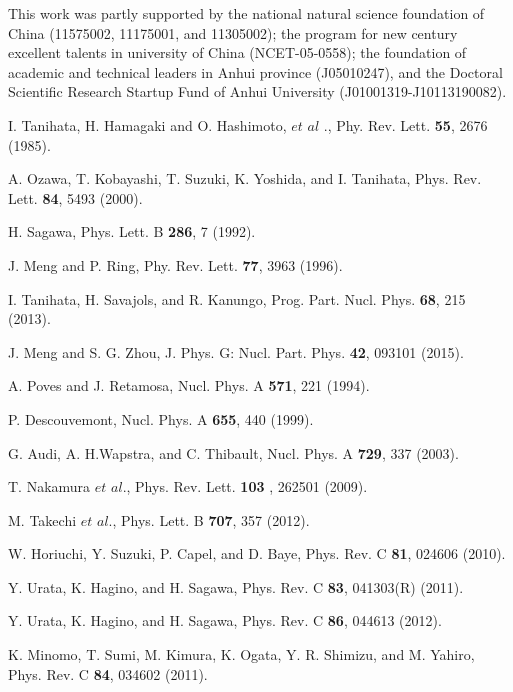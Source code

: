 \documentclass[twocolumn,prc,showpacs,preprintnumbers,superscriptaddress,floatfix]{revtex4}
\begin{document}
\begin{acknowledgments}
This work was partly supported by the national natural science foundation of
China (11575002, 11175001, and 11305002); the program for new century
excellent talents in university of China (NCET-05-0558); the foundation of
academic and technical leaders in Anhui province (J05010247), and the Doctoral Scientific Research Startup Fund of Anhui University (J01001319-J10113190082).
\end{acknowledgments}

\begin{thebibliography}{99}
 I. Tanihata, H. Hamagaki and O. Hashimoto, $et$ $al$%
., Phy. Rev. Lett. \textbf{55}, 2676 (1985).

 A. Ozawa, T. Kobayashi, T. Suzuki, K. Yoshida, and I.
Tanihata, Phys. Rev. Lett. \textbf{84}, 5493 (2000).

 H. Sagawa, Phys. Lett. B \textbf{286}, 7 (1992).

 J. Meng and P. Ring, Phy. Rev. Lett. \textbf{77}, 3963
(1996).

 I. Tanihata, H. Savajols, and R. Kanungo, Prog. Part.
Nucl. Phys. \textbf{68}, 215 (2013).

 J. Meng and S. G. Zhou, J. Phys. G: Nucl. Part. Phys.
\textbf{42}, 093101 (2015).

 A. Poves and J. Retamosa, Nucl. Phys. A \textbf{571},
221 (1994).

 P. Descouvemont, Nucl. Phys. A \textbf{655}, 440
(1999).

 G. Audi, A. H.Wapstra, and C. Thibault, Nucl. Phys. A
\textbf{729}, 337 (2003).

 T. Nakamura $et$ $al$., Phys. Rev. Lett. \textbf{103}%
, 262501 (2009).

 M. Takechi $et$ $al$., Phys. Lett. B \textbf{707}, 357
(2012).

 W. Horiuchi, Y. Suzuki, P. Capel, and D. Baye, Phys.
Rev. C \textbf{81}, 024606 (2010).

 Y. Urata, K. Hagino, and H. Sagawa, Phys. Rev. C \textbf{%
83}, 041303(R) (2011).

 Y. Urata, K. Hagino, and H. Sagawa, Phys. Rev. C \textbf{%
86}, 044613 (2012).

 K. Minomo, T. Sumi, M. Kimura, K. Ogata, Y. R. Shimizu,
and M. Yahiro, Phys. Rev. C \textbf{84}, 034602 (2011).


\end{thebibliography}
\end{document}
